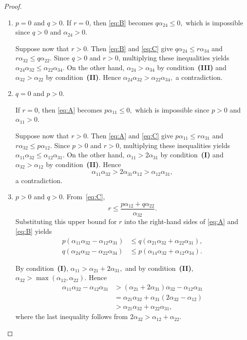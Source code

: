 \documentclass[12pt,a4paper]{amsart}
\theoremstyle{definition}
\begin{document}
\begin{proof}
\begin{enumerate}
\begin{enumerate}
\item[(b)] $p=0$ and $q>0$. If $r=0$, then \eqref{eq:B} becomes
$
q\alpha_{24}\le0,$
which is impossible since $q>0$ and $\alpha_{24}>0$.

Suppose now that $r>0$.
Then \eqref{eq:B} and \eqref{eq:C} give
$
q\alpha_{24}\le r\alpha_{34}$ and $r\alpha_{32}\le q\alpha_{22}.$
Since $q>0$ and $r>0$, multiplying these inequalities yields
$
\alpha_{24}\alpha_{32}
\le
\alpha_{22}\alpha_{34}.$
On the other hand,
$\alpha_{24}>\alpha_{34}$ by condition~\textup{\textbf{(III)}}
and
$\alpha_{32}>\alpha_{22}$ by condition~\textup{\textbf{(II)}}.
Hence
$
\alpha_{24}\alpha_{32}
>
\alpha_{22}\alpha_{34},$
a contradiction.

\item[(c)] $q=0$ and $p>0$.

If $r=0$, then \eqref{eq:A} becomes
$
p\alpha_{11}\le0,$
which is impossible since $p>0$ and $\alpha_{11}>0$.

Suppose now that $r>0$.
Then \eqref{eq:A} and \eqref{eq:C} give
$
p\alpha_{11}\le r\alpha_{31}$ and $r\alpha_{32}\le p\alpha_{12}$.
Since $p>0$ and $r>0$, multiplying these inequalities yields
$
\alpha_{11}\alpha_{32}
\le
\alpha_{12}\alpha_{31}.$
On the other hand,
$\alpha_{11}>2\alpha_{31}$ by
condition~\textup{\textbf{(I)}}
and
$\alpha_{32}>\alpha_{12}$ by
condition~\textup{\textbf{(II)}}.
Hence
\[
\alpha_{11}\alpha_{32}
>
2\alpha_{31}\alpha_{12}
>
\alpha_{12}\alpha_{31},
\]
a contradiction.

\item[(d)] $p>0$ and $q>0$. From~\eqref{eq:C},
\[
r\le\frac{p\alpha_{12}+q\alpha_{22}}{\alpha_{32}}.
\]
Substituting this upper bound for $r$ into the right-hand sides of
\eqref{eq:A} and \eqref{eq:B} yields
\begin{align}
p(\alpha_{11}\alpha_{32}-\alpha_{12}\alpha_{31})
&\le
q(\alpha_{21}\alpha_{32}+\alpha_{22}\alpha_{31}),
\label{eq:pq1}\\
q(\alpha_{24}\alpha_{32}-\alpha_{22}\alpha_{34})
&\le
p(\alpha_{14}\alpha_{32}+\alpha_{12}\alpha_{34}).
\label{eq:pq2}
\end{align}

By condition~\textup{\textbf{(I)}},
$
\alpha_{11}>\alpha_{21}+2\alpha_{31},$
and by condition~\textup{\textbf{(II)}},
$
\alpha_{32}>\max(\alpha_{12},\alpha_{22}).$
Hence
\begin{align*}
\alpha_{11}\alpha_{32}-\alpha_{12}\alpha_{31}
&>
(\alpha_{21}+2\alpha_{31})\alpha_{32}-\alpha_{12}\alpha_{31} \\
&=
\alpha_{21}\alpha_{32}
+\alpha_{31}(2\alpha_{32}-\alpha_{12}) \\
&>
\alpha_{21}\alpha_{32}
+\alpha_{22}\alpha_{31},
\end{align*}
where the last inequality follows from
$
2\alpha_{32}
>
\alpha_{12}+\alpha_{22}.$


\end{enumerate}
\end{enumerate}
\end{proof}
\end{document}
